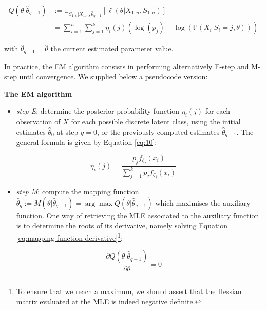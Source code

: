\begin{equation}
\begin{split}
Q(\theta|\hat{\theta}_{q-1}) & := \mathbb{E}_{S_{1:n}| X_{1:n}, \hat{\theta}_{q-1}} \left[\ell(\theta | X_{1:n}, S_{1:n})\right] \\
&=\sum_{i=1}^n \sum_{j=1}^k \eta_{i}(j) \left( \log (p_j) +  \log (\mathbb{P}(X_i|S_i=j, \theta)) \right)
\end{split}
\label{eq:8}
\end{equation}

with \(\hat{\theta}_{q-1}=\hat{\theta}\) the current estimated parameter
value.

In practice, the EM algorithm consists in performing alternatively E-step and M-step until convergence. We supplied below a pseudocode version:

\begin{blackbox}{\textbf{The EM algorithm}}

\begin{center}

\begin{itemize}
\tightlist
\item
  \emph{step E}: determine the posterior probability function \(\eta_i(j)\)
  for each observation of \(X\) for each possible discrete latent class,
  using the initial estimates \(\hat{\theta}_0\) at step \(q=0\), or the
  previously computed estimates \(\hat{\theta}_{q-1}\). The general formula is given by Equation \eqref{eq:10}:
\end{itemize}

\begin{equation}
    \eta_i(j) = \frac{p_j f_{\zeta_j} (x_i)}{\sum_{j=1}^k p_j f_{\zeta_j} (x_i)}
\label{eq:10}
\end{equation}

\begin{itemize}
\tightlist
\item
  \emph{step M}: compute the mapping function
  \(\hat{\theta}_q:=M(\theta | \hat{\theta}_{q-1})=\arg \max Q(\theta| \hat{\theta}_{q-1})\) which maximises the auxiliary function. One way of retrieving the MLE associated to the auxiliary function is to determine the roots of its derivative, namely solving Equation \eqref{eq:mapping-function-derivative}\footnote{To ensure
    that we reach a maximum, we should assert that the Hessian matrix evaluated at the MLE is indeed negative definite.}:
\end{itemize}

\begin{equation}
    \frac{\partial Q(\theta| \hat{\theta}_{q-1})}{\partial \theta}=0
\label{eq:mapping-function-derivative}
\end{equation}

\end{center}

\end{blackbox}

